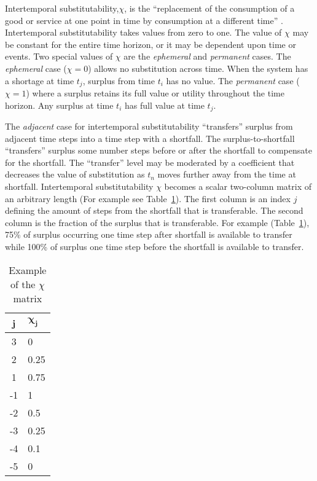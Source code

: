 \documentclass[preprint,12pt]{elsarticle}
\begin{document}
Intertemporal substitutability,$\chi$, is the ``replacement of the consumption
of a good or service at one point in time by consumption at a
different time'' \cite{Black2013}. Intertemporal substitutability takes 
values from zero to one. The value of $\chi$ may be constant for the
entire time horizon, or it may be dependent upon time or events. Two
special values of $\chi$ are the \emph{ephemeral} and \emph{permanent}
cases. The \emph{ephemeral} case ($\chi = 0$) allows no substitution across
time. When the system has a shortage at time $t_j$, surplus from time
$t_i$ has no value. The  \emph{permanent} case ($\chi = 1$) where a
surplus retains its full value or utility throughout the time
horizon. Any surplus at time $t_i$ has full value at time $t_j$.



The \emph{adjacent}
case for intertemporal substitutability ``transfers'' surplus from adjacent
time steps into a time step with a shortfall. The surplus-to-shortfall
``transfers'' surplus some number steps before or after 
the shortfall to compensate for the shortfall. The ``transfer'' level may be moderated by a
coefficient that decreases the value of substitution as $t_n$ moves
further away from the time at shortfall.  Intertemporal
substitutability $\chi$ becomes a scalar two-column matrix of an
arbitrary length (For example see Table~\ref{t:chiVec}). The first
column is an index $j$ defining the amount 
of steps from the shortfall that is transferable. The second column is
the fraction of the surplus that is transferable. For example (Table~\ref{t:chiVec}),
 75\% of surplus occurring one time step after shortfall is available
 to transfer while 100\% of surplus one time step before the shortfall
 is available to transfer.


\begin{table}[h]
  \centering
  \begin{tabular}{c l }
    \hline
    \hline
    \textbf{j} & $\mathbf{\chi_j}$ \\
    \hline
    3 & 0 \\
    2 & 0.25 \\
    1 & 0.75 \\
    -1 & 1 \\
    -2 & 0.5 \\
    -3 & 0.25 \\
    -4 & 0.1 \\
    -5 & 0 \\
    \hline
  \end{tabular}
  \caption{Example of the $\chi$ matrix}
  \label{t:chiVec}
\end{table}
\end{document}
